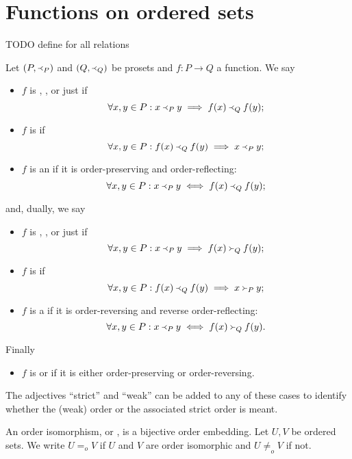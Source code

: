 \section{Functions on ordered sets}
TODO define for all relations
\begin{definition}
Let $(P, \Yleft_P)$ and $(Q, \Yleft_Q)$ be prosets and $f: P\to Q$ a function. We say
\begin{itemize}
\item $f$ is , ,  or just  if
\[ \forall x,y\in P: x\Yleft_P y \implies f(x)\Yleft_Q f(y); \]
\item $f$ is  if
\[ \forall x,y\in P: f(x)\Yleft_Q f(y) \implies x\Yleft_P y; \]
\item $f$ is an  if it is order-preserving and order-reflecting:
\[ \forall x,y\in P: x\Yleft_P y \iff f(x)\Yleft_Q f(y); \]
\end{itemize}
and, dually, we say
\begin{itemize}
\item $f$ is , ,  or just  if
\[ \forall x,y\in P: x\Yleft_P y \implies f(x) \Yright_Q f(y); \]
\item $f$ is  if
\[ \forall x,y\in P: f(x)\Yleft_Q f(y) \implies x\Yright_P y; \]
\item $f$ is a  if it is order-reversing and reverse order-reflecting:
\[ \forall x,y\in P: x\Yleft_P y \iff f(x)\Yright_Q f(y). \]
\end{itemize}
Finally
\begin{itemize}
\item $f$ is  or  if it is either order-preserving or order-reversing.
\end{itemize}

The adjectives ``strict'' and ``weak'' can be added to any of these cases to identify whether the (weak) order or the associated strict order is meant.
\end{definition}
An order isomorphism, or , is a bijective order embedding. Let $U,V$ be ordered sets. We write $U =_o V$ if $U$ and $V$ are order isomorphic and $U \neq_o V$ if not.

